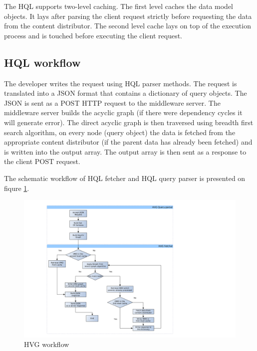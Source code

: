 The HQL supports two-level caching. The first level caches the data model objects. It lays after parsing the client request strictly before requesting the data from the content distributor. The second level cache lays on top of the execution process and is touched before executing the client request.  


\subsection{HQL workflow}

The developer writes the request using HQL parser methods. The request is translated into a JSON format that contains a dictionary of query objects. The JSON is sent as a POST HTTP request to the middleware server. The middleware server builds the acyclic graph (if there were dependency cycles it will generate error). The direct acyclic graph is then traversed using breadth first search algorithm, on every node (query object) the data is fetched from the appropriate content distributor (if the parent data has already been fetched) and is written into the output array. The output array is then sent as a response to the client POST request. 

The schematic workflow of HQL fetcher and HQL query parser is presented on fiqure \ref{fig:hvg_workflow}.

\begin{figure}[h]
	\begin{center}
		\includegraphics[width=20cm]{images/hvg_qp_workflow.png}
   		\caption{HVG workflow}
    	\label{fig:hvg_workflow}
	\end{center}
\end{figure}

